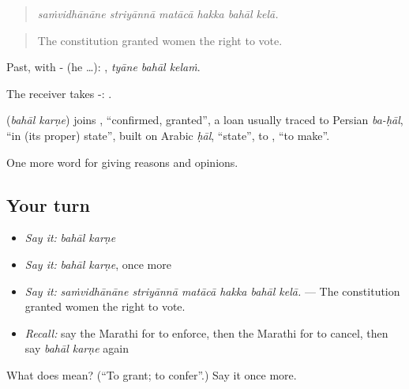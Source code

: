 \begin{quote}
\emph{saṁvidhānāne striyānnā matācā hakka bahāl kelā.}
\end{quote}

\begin{quote}
The constitution granted women the right to vote.
\end{quote}

Past, with - (he …):   , \emph{tyāne bahāl kelaṁ}.

The receiver takes -:    .

\begin{cousinweb}
\textbf{ } (\emph{bahāl karṇe}) joins , \textquotedblleft{}confirmed, granted\textquotedblright{}, a loan usually traced to Persian \emph{ba-ḥāl}, \textquotedblleft{}in (its proper) state\textquotedblright{}, built on Arabic \emph{ḥāl}, \textquotedblleft{}state\textquotedblright{}, to , \textquotedblleft{}to make\textquotedblright{}.
\end{cousinweb}

\begin{grammarlens}[title={What you've built}]
One more word for giving reasons and opinions.
\end{grammarlens}

\subsection*{Your turn}
\begin{itemize}
\raggedright
  \item \emph{Say it:} \emph{bahāl karṇe}
  \item \emph{Say it:} \emph{bahāl karṇe}, once more
  \item \emph{Say it:} \emph{saṁvidhānāne striyānnā matācā hakka bahāl kelā.} — The constitution granted women the right to vote.
  \item \emph{Recall:} say the Marathi for to enforce, then the Marathi for to cancel, then say \emph{bahāl karṇe} again
\end{itemize}

\begin{tcolorbox}[breakable,colback=teal!4,colframe=teal!35!black,title={Before you move on}]
What does   mean? (\textquotedblleft{}To grant; to confer\textquotedblright{}.) Say it once more.
\end{tcolorbox}
